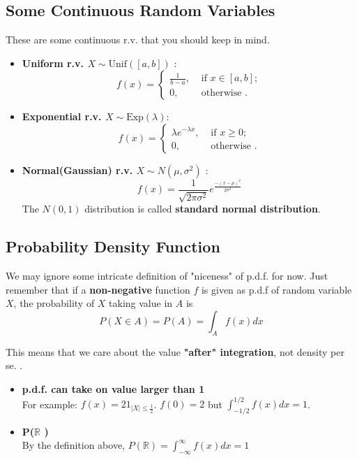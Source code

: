 \subsection*{Some Continuous Random Variables}
These are some continuous r.v. that you should keep in mind.  
\begin{itemize}
    \item \textbf{Uniform r.v. \(X \sim \text{Unif}([a,b])\) }:\\
        \[
            f(x) = \begin{cases}
                \frac{1}{b-a}, &\text{ if } x \in [a,b] ;\\
                0, &\text{ otherwise }  .
            \end{cases}
        \]
    \item \textbf{Exponential r.v. \(X \sim \text{Exp}(\lambda )  \)}: \\
    \[
        f(x) = \begin{cases}
            \lambda e^{-\lambda x}, &\text{ if } x\geq 0 ;\\
            0 , &\text{ otherwise }  .
        \end{cases}
    \]
    \item \textbf{Normal(Gaussian) r.v. \(X \sim N(\mu ,\sigma^2) \) }: \\   
    \[
        f(x) = \frac{1}{\sqrt{2 \pi \sigma^2 }} e^{\frac{-(x-\mu )^2}{2 \sigma^2}}
    \]
    The \(N(0,1)\) distribution is called \textbf{standard normal distribution}.   
\end{itemize}
\subsection*{Probability Density Function}
We may ignore some intricate definition of "niceness" of p.d.f. for now. Just remember that if a \textbf{non-negative} function \(f\) is given as p.d.f of random variable \(X\), 
the probability of \(X\) taking value in \(A\) is 
\[
    P(X \in A) = P(A) = \int_A f(x)dx
\] 

This means that we care about the value \textbf{"after" integration}, not density per se. .
\begin{itemize}
    \item \textbf{p.d.f. can take on value larger than 1} \\ 
            For example: \(f(x) = 2 1_{|X| \leq  \frac{1}{2}} \). \(f(0) = 2\) but \(\int_{-1 /2 }^{1 /2} f(x)dx  = 1\).   
    \item \textbf{P(\(\mathbb{R} \) )}\\ 
            By the definition above, \(P(\mathbb{R} ) = \int_{-\infty }^{\infty} f(x)dx = 1 \)   
\end{itemize}


